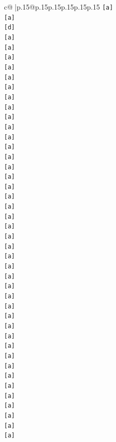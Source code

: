 \documentclass{article}
\begin{document}
{\begin{supertabular}{c@{$\;$}|p{.15\linewidth}@{}p{.15\linewidth}p{.15\linewidth}p{.15\linewidth}p{.15\linewidth}p{.15\linewidth}}
{{{\texttt{{[}a{]}} \\
\texttt{{[}a{]}} \\
\texttt{{[}d{]}} \\
\texttt{{[}a{]}} \\
\texttt{{[}a{]}} \\
\texttt{{[}a{]}} \\
\texttt{{[}a{]}} \\
\texttt{{[}a{]}} \\
\texttt{{[}a{]}} \\
\texttt{{[}a{]}} \\
\texttt{{[}a{]}} \\
\texttt{{[}a{]}} \\
\texttt{{[}a{]}} \\
\texttt{{[}a{]}} \\
\texttt{{[}a{]}} \\
\texttt{{[}a{]}} \\
\texttt{{[}a{]}} \\
\texttt{{[}a{]}} \\
\texttt{{[}a{]}} \\
\texttt{{[}a{]}} \\
\texttt{{[}a{]}} \\
\texttt{{[}a{]}} \\
\texttt{{[}a{]}} \\
\texttt{{[}a{]}} \\
\texttt{{[}a{]}} \\
\texttt{{[}a{]}} \\
\texttt{{[}a{]}} \\
\texttt{{[}a{]}} \\
\texttt{{[}a{]}} \\
\texttt{{[}a{]}} \\
\texttt{{[}a{]}} \\
\texttt{{[}a{]}} \\
\texttt{{[}a{]}} \\
\texttt{{[}a{]}} \\
\texttt{{[}a{]}} \\
\texttt{{[}a{]}} \\
\texttt{{[}a{]}} \\
\texttt{{[}a{]}} \\
\texttt{{[}a{]}} \\
\texttt{{[}a{]}} \\
\texttt{{[}a{]}} \\
\texttt{{[}a{]}} \\
\texttt{{[}a{]}} \\
\texttt{{[}a{]}} \\
}}}
\end{supertabular}}
\end{document}
